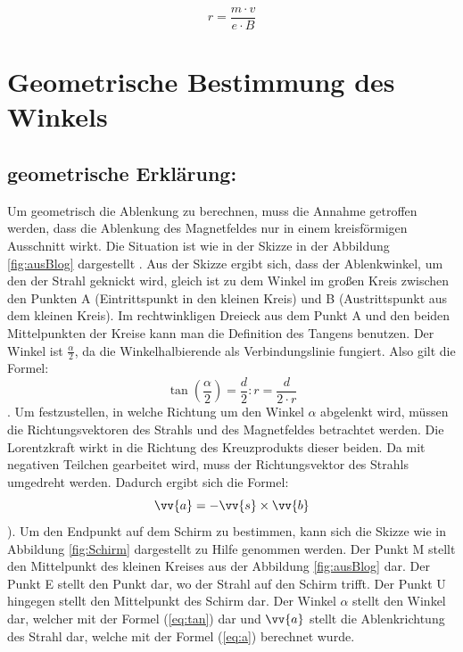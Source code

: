 \begin{equation}
     \label{eq:r}
     r = \frac{m \cdot v}{e \cdot B}
\end{equation}

\section{Geometrische Bestimmung des Winkels}

\subsection{geometrische Erklärung:}

Um geometrisch die Ablenkung zu berechnen, muss die Annahme getroffen werden, dass die Ablenkung des Magnetfeldes nur in einem kreisförmigen Ausschnitt wirkt.
Die Situation ist wie in der Skizze in der Abbildung \ref{fig:ausBlog} dargestellt \cite{Blog}.
Aus der Skizze ergibt sich, dass der Ablenkwinkel, um den der Strahl geknickt wird, gleich ist zu dem Winkel im großen Kreis zwischen den Punkten A (Eintrittspunkt in den kleinen Kreis) und B (Austrittspunkt aus dem kleinen Kreis).
Im rechtwinkligen Dreieck aus dem Punkt A und den beiden Mittelpunkten der Kreise kann man die Definition des Tangens benutzen.
Der Winkel ist $\frac{\alpha}{2}$, da die Winkelhalbierende als Verbindungslinie fungiert.
Also gilt die Formel:
\begin{equation}
    \label{eq:tan}
    \tan(\frac{\alpha}{2}) = \frac{d}{2}:r = \frac{d}{2 \cdot r}
\end{equation}.
Um festzustellen, in welche Richtung um den Winkel $\alpha$ abgelenkt wird, müssen die Richtungsvektoren des Strahls und des Magnetfeldes betrachtet werden.
Die Lorentzkraft wirkt in die Richtung des Kreuzprodukts dieser beiden.
Da mit negativen Teilchen gearbeitet wird, muss der Richtungsvektor des Strahls umgedreht werden. Dadurch ergibt sich die Formel: \begin{equation}
    \label{eq:a}
    \vv{a} = - \vv{s}\times \vv{b}
\end{equation}).
Um den Endpunkt auf dem Schirm zu bestimmen, kann sich die Skizze wie in Abbildung \ref{fig:Schirm} dargestellt zu Hilfe genommen werden.
Der Punkt M stellt den Mittelpunkt des kleinen Kreises aus der Abbildung \ref{fig:ausBlog} dar.
Der Punkt E stellt den Punkt dar, wo der Strahl auf den Schirm trifft.
Der Punkt U hingegen stellt den Mittelpunkt des Schirm dar.
Der Winkel $\alpha$ stellt den Winkel dar, welcher mit der Formel (\ref{eq:tan}) dar und $\vv{a}$ stellt die Ablenkrichtung des Strahl dar, welche mit der Formel (\ref{eq:a}) berechnet wurde.

